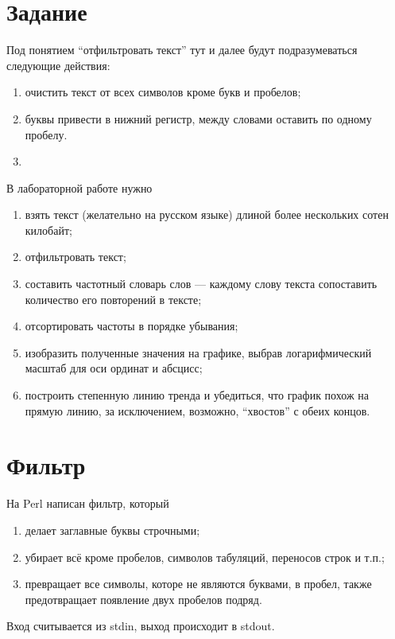 \section{Задание}

Под понятием ``отфильтровать текст'' тут и далее будут подразумеваться
следующие действия:
\begin{enumerate}
  \item
    очистить текст от всех символов кроме букв и пробелов;
  \item
    буквы привести в нижний регистр, между словами оставить по одному пробелу.
  \item
\end{enumerate}

В лабораторной работе нужно
\begin{enumerate}
  \item
    взять текст (желательно на русском языке)
    длиной более нескольких сотен килобайт;
  \item
    отфильтровать текст;
  \item
    составить частотный словарь слов --- каждому слову текста
    сопоставить количество его повторений в тексте;
  \item
    отсортировать частоты в порядке убывания;
  \item
    изобразить полученные значения на графике,
    выбрав логарифмический масштаб для оси ординат и абсцисс;
  \item
    построить степенную линию тренда и убедиться,
    что график похож на прямую линию, за исключением, возможно,
    ``хвостов'' с обеих концов.
\end{enumerate}

\section{Фильтр}
На Perl написан фильтр, который
\begin{enumerate}
  \item делает заглавные буквы строчными;
  \item убирает всё кроме пробелов, символов табуляций, переносов строк и т.п.;
  \item превращает все символы, которе не являются буквами, в пробел, также
    предотвращает появление двух пробелов подряд.
\end{enumerate}

Вход считывается из stdin, выход происходит в stdout.

\lstset{inputencoding=utf8, extendedchars=\true}


